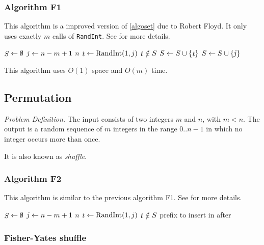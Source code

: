 \documentclass[12pt]{article}
\begin{document}
\subsubsection{Algorithm F1}

This algorithm is a improved version of \ref{algoset} due to Robert Floyd.
It only uses exactly $m$ calls of {\tt RandInt}.  See \cite{bently87} for
more details.

\begin{codebox}
\li $\id{S} \gets \emptyset$
\li \For $\id{j} \gets n-m+1$ \To $n$
\li     \Do $\id{t} \gets \func{RandInt}(1, j)$
\li         \If $\id{t} \notin S$
\li             \Then 
\li                 $S \gets S \cup \{\id{t}\}$
\li         \Else
\li             $S \gets S \cup \{\id{j}\}$
            \End
        \End
\end{codebox}

This algorithm uses $O(1)$ space and $O(m)$ time.

\subsection{Permutation}

\emph{Problem Definition.}
    The input consists of two integers $m$ and $n$, with $m < n$. The
    output is a random sequence of $m$ integers in the range $0..n-1$ in
    which no integer occurs more than once.
    
It is also known as \emph{shuffle}.

\subsubsection{Algorithm F2}

This algorithm is similar to the previous algorithm F1.  See \cite{bently87} for
more details.

\begin{codebox}
\li $\id{S} \gets \emptyset$
\li \For $\id{j} \gets n-m+1$ \To $n$
\li     \Do $\id{t} \gets \func{RandInt}(1, j)$
\li         \If $\id{t} \notin S$
\li             \Then 
\li                 prefix  to 
\li         \Else
\li             insert  in  after 
            \End
        \End
\end{codebox}

\subsubsection{Fisher-Yates shuffle}
\end{document}
